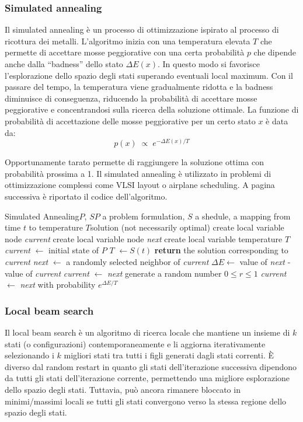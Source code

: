 \subsubsection*{Simulated annealing}
Il simulated annealing è un processo di ottimizzazione ispirato al processo di ricottura dei metalli. L'algoritmo inizia con una
temperatura elevata \(T\) che permette di accettare mosse peggiorative con una certa probabilità \(p\) che dipende anche dalla
``badness'' dello stato \(\Delta E(x)\). In questo modo si favorisce l'esplorazione dello spazio degli stati superando eventuali
local maximum. Con il passare del tempo, la temperatura viene gradualmente ridotta e la badness diminuisce di conseguenza,
riducendo la probabilità di accettare mosse peggiorative e concentrandosi sulla ricerca della soluzione ottimale. 
La funzione di probabilità di accettazione delle mosse peggiorative per un certo stato \(x\) è data da:
\[p(x) \; \propto \; e^{-\Delta E(x) / T}\]

Opportunamente tarato permette di raggiungere la soluzione ottima con probabilità prossima a 1. Il simulated annealing è
utilizzato in problemi di ottimizzazione complessi come VLSI layout o airplane scheduling. A pagina successiva è riportato il
codice dell'algoritmo.

\newpage

\begin{algo}{Simulated Annealing}{$P$, $S$}{$P$ a problem formulation, $S$ a shedule, a mapping from time $t$ to temperature $T$}{solution (not necessarily optimal)}
	\State create local variable node \textit{current}
	\State create local variable node \textit{next}
	\State create local variable temperature $T$
	\State \textit{current} $\gets$ initial state of $P$
		\State $T$ $\gets S(t)$
			\State \textbf{return} the solution corresponding to \textit{current} 
		\EndIf
		\State \textit{next} $\gets$ a randomly selected neighbor of \textit{current}
		\State \(\Delta E \gets\) value of \textit{next} - value of \textit{current}
			\State \textit{current} $\gets$ \textit{next} 
		\Else
			\State generate a random number \(0 \leq r \leq 1\)
			\State \textit{current} $\gets$ \textit{next} with probability \(e^{\Delta E / T}\) 
		\EndIf
	\EndFor
\end{algo}

\subsubsection*{Local beam search}
Il local beam search è un algoritmo di ricerca locale che mantiene un insieme di \(k\) stati (o configurazioni) contemporaneamente
e li aggiorna iterativamente selezionando i \(k\) migliori stati tra tutti i figli generati dagli stati correnti. È diverso dal
random restart in quanto gli stati dell'iterazione successiva dipendono da tutti gli stati dell'iterazione corrente, permettendo una
migliore esplorazione dello spazio degli stati. Tuttavia, può ancora rimanere bloccato in minimi/massimi locali se tutti gli stati
convergono verso la stessa regione dello spazio degli stati.

